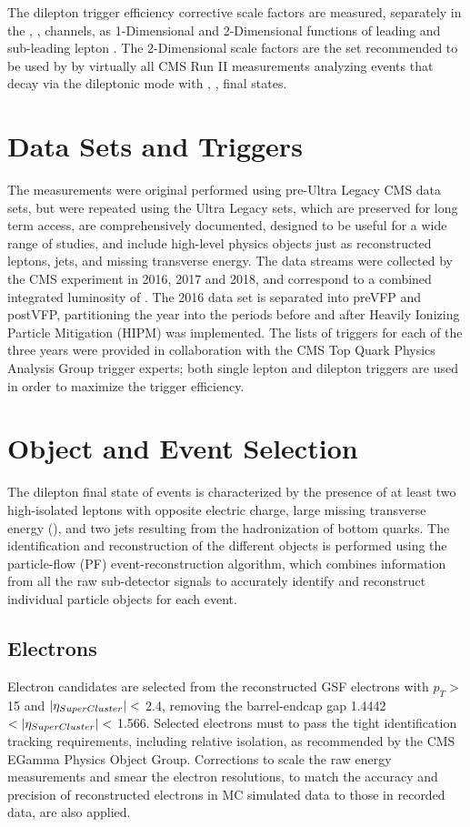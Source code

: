 The dilepton trigger efficiency corrective scale factors are measured, separately in the \ee, \emu, \mumu channels, as 1-Dimensional and 2-Dimensional functions of leading and sub-leading lepton \pT.
The 2-Dimensional scale factors are the set recommended to be used by by virtually all CMS Run II measurements analyzing \ttbar events that decay via the dileptonic mode with \ee, \emu, \mumu final states.

\section{Data Sets and Triggers}
The measurements were original performed using pre-Ultra Legacy CMS data sets, but were repeated using the Ultra Legacy sets, which are preserved for long term access, are comprehensively documented, designed to be useful for a wide range of studies, and include high-level physics objects just as reconstructed leptons, jets, and missing transverse energy.
The data streams were collected by the CMS experiment in 2016, 2017 and 2018, and correspond to a combined integrated luminosity of \lumivalueRuniiUL.
The 2016 data set is separated into preVFP and postVFP, partitioning the year into the periods before and after Heavily Ionizing Particle Mitigation (HIPM) was implemented.
The lists of triggers for each of the three years were provided in collaboration with the CMS Top Quark Physics Analysis Group trigger experts; both single lepton and dilepton triggers are used in order to maximize the trigger efficiency. 

\section{Object and Event Selection}
The dilepton final state of \ttbar events is characterized by the presence of at least two high-\pT isolated leptons with opposite electric charge, large missing transverse energy (\MET), and two jets resulting from the hadronization of bottom quarks.
The identification and reconstruction of the different objects is performed using the particle-flow (PF) event-reconstruction algorithm, which combines information from all the raw sub-detector signals to accurately identify and reconstruct individual particle objects for each event. 
\subsection{Electrons}
Electron candidates are selected from the reconstructed GSF electrons with $p_{T}>$ 15 \GeV and $\left\vert\eta_{SuperCluster}\right\vert<$ 2.4, removing the barrel-endcap gap 1.4442 $< \left\vert\eta_{SuperCluster}\right\vert<$ 1.566. 
Selected electrons must to pass the tight identification tracking requirements, including relative isolation, as recommended by the CMS EGamma Physics Object Group.
Corrections to scale the raw energy measurements and smear the electron resolutions, to match the accuracy and precision of reconstructed electrons in MC simulated data to those in recorded data, are also applied.
